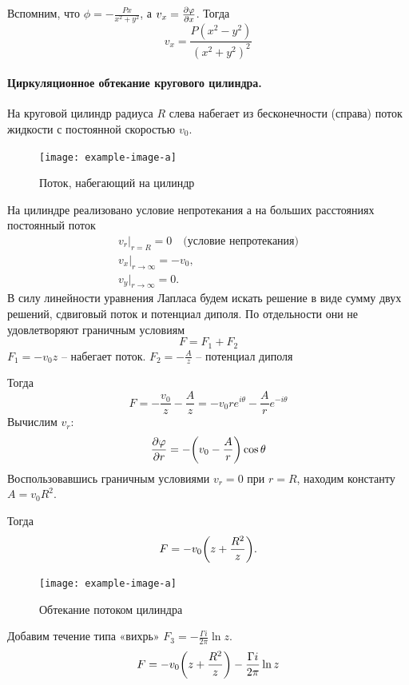 Вспомним, что $\phi=-\frac{Px}{x^2+y^2}$, а $v_x=\pdv{\varphi}{x}$. Тогда 
$$
v_x=\frac{P(x^2-y^2)}{(x^2+y^2)^2}
$$

\paragraph{Циркуляционное обтекание кругового цилиндра.} 
На круговой цилиндр радиуса $R$ слева набегает из бесконечности
(справа) поток жидкости с постоянной скоростью $v_0$.
\begin{figure}[h!]
    \centering
    \texttt{[image: example-image-a]}
    \caption{Поток, набегающий на цилиндр}
    \label{fig:figure1}
\end{figure}

На цилиндре реализовано условие непротекания а на больших
расстояниях постоянный поток
\begin{gather}
	v_r|_{r=R}=0 \quad \text{(условие непротекания)} \\ 
	v_x|_{r\to\infty}=-v_0, \\
	v_y|_{r\to\infty}=0.
\end{gather}
В силу линейности уравнения Лапласа будем искать решение в виде
сумму двух решений, сдвиговый поток и потенциал диполя. По
отдельности они не удовлетворяют граничным условиям
\begin{equation}
	F=F_1+F_2
\end{equation}
$F_1=-v_0z$ -- набегает поток. 
$\displaystyle F_2=-\frac{A}{z}$ -- потенциал диполя

Тогда
 $$ F=-\frac{v_0}{z}-\frac{A}{z}=-v_0r e^{i\theta} -\frac{A}{r} e^{-i\theta}$$
Вычислим $v_r$:
\begin{equation}
	\pdv{\varphi}{r}=-\qty(v_0-\frac{A}{r})\cos\theta
\end{equation}
Воспользовавшись граничным условиями $v_r=0$ при $r=R$, находим константу $A=v_0R^2$.

Тогда
\begin{equation}
	F=-v_0\qty(z+\frac{R^2}{z}).
\end{equation}
\begin{figure}[h!]
    \centering
    \texttt{[image: example-image-a]}
    \caption{Обтекание потоком цилиндра}
    \label{fig:figure1}
\end{figure}

Добавим течение типа «вихрь» $F_3=-\frac{\Gamma i}{2\pi}\ln{z}$.
\begin{equation}
	F=-v_0\qty(z+\frac{R^2}{z})-\frac{\Gamma i}{2\pi}\ln{z}
\end{equation}

